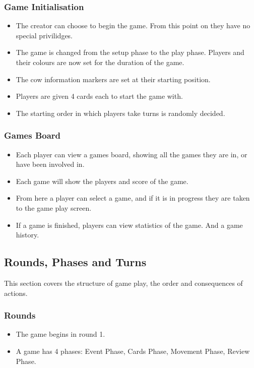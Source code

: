 	\subsubsection{Game Initialisation}
	  \begin{itemize}
	  	\item \pA The creator can choose to begin the game. From this point on they have no special privilidges.
	  	\item \pA The game is changed from the setup phase to the play phase. Players and their colours are now set for the duration of the game.
	  	\item \pA The cow information markers are set at their starting position.
	  	\item \pA Players are given 4 cards each to start the game with.
	  	\item \pB The starting order in which players take turns is randomly decided.
	  \end{itemize}
	\subsubsection{Games Board}
	  \begin{itemize}
	  	\item \pA Each player can view a games board, showing all the games they are in, or have been involved in.
	  	\item \pB Each game will show the players and score of the game.
	  	\item \pA From here a player can select a game, and if it is in progress they are taken to the game play screen.
	  	\item \pD If a game is finished, players can view statistics of the game. And a game history.
	  \end{itemize}

\subsection{Rounds, Phases and Turns}
This section covers the structure of game play, the order and consequences of actions.
	\subsubsection{Rounds}
	  \begin{itemize}
	  	\item \pA The game begins in round 1.
	  	\item \pA A game has 4 phases: Event Phase, Cards Phase, Movement Phase, Review Phase.
	  \end{itemize}
